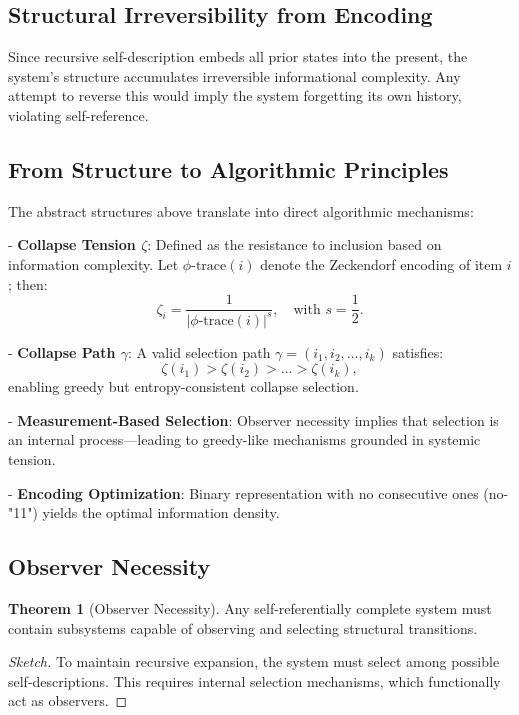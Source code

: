 \documentclass[11pt]{article}
\theoremstyle{remark}
\theoremstyle{definition}
\newtheorem{theorem}{Theorem}
\begin{document}
\subsection{Structural Irreversibility from Encoding}

Since recursive self-description embeds all prior states into the present, the system's structure accumulates irreversible informational complexity. Any attempt to reverse this would imply the system forgetting its own history, violating self-reference.

\subsection{From Structure to Algorithmic Principles}

The abstract structures above translate into direct algorithmic mechanisms:

- \textbf{Collapse Tension $\zeta$}: Defined as the resistance to inclusion based on information complexity. Let $\phi\text{-trace}(i)$ denote the Zeckendorf encoding of item $i$; then:
  \[
  \zeta_i = \frac{1}{|\phi\text{-trace}(i)|^s}, \quad \text{with } s = \frac{1}{2}.
  \]

- \textbf{Collapse Path $\gamma$}: A valid selection path $\gamma = (i_1, i_2, \ldots, i_k)$ satisfies:
  \[
  \zeta(i_1) > \zeta(i_2) > \ldots > \zeta(i_k),
  \]
  enabling greedy but entropy-consistent collapse selection.

- \textbf{Measurement-Based Selection}: Observer necessity implies that selection is an internal process—leading to greedy-like mechanisms grounded in systemic tension.

- \textbf{Encoding Optimization}: Binary representation with no consecutive ones (no-"11") yields the optimal information density.

\subsection{Observer Necessity}

\begin{theorem}[Observer Necessity]
Any self-referentially complete system must contain subsystems capable of observing and selecting structural transitions.
\end{theorem}

\begin{proof}[Sketch]
To maintain recursive expansion, the system must select among possible self-descriptions. This requires internal selection mechanisms, which functionally act as observers.
\end{proof}
\end{document}
